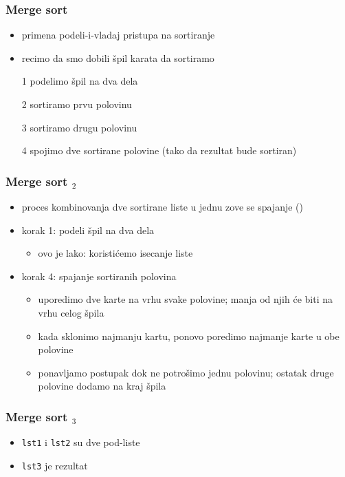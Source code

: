 \documentclass[utf8,compress]{beamer}
\begin{document}
\begin{frame}[fragile]
  \frametitle{Merge sort}
  \begin{itemize}
    \item primena podeli-i-vladaj pristupa na sortiranje
    \item recimo da smo dobili špil karata da sortiramo
    \item[1] podelimo špil na dva dela
    \item[2] sortiramo prvu polovinu
    \item[3] sortiramo drugu polovinu
    \item[4] spojimo dve sortirane polovine (tako da rezultat bude sortiran)
  \end{itemize}
\end{frame}

\begin{frame}[fragile]
  \frametitle{Merge sort $_2$}
  \begin{itemize}
    \item proces kombinovanja dve sortirane liste u jednu zove se spajanje ()
    \item korak 1: podeli špil na dva dela
  \begin{itemize}
    \item ovo je lako: koristićemo isecanje liste
  \end{itemize}
    \item korak 4: spajanje sortiranih polovina
  \begin{itemize}
    \item uporedimo dve karte na vrhu svake polovine; manja od njih će biti na vrhu celog špila
    \item kada sklonimo najmanju kartu, ponovo poredimo najmanje karte u obe polovine
    \item ponavljamo postupak dok ne potrošimo jednu polovinu; ostatak druge polovine dodamo na kraj špila
  \end{itemize}
  \end{itemize}
\end{frame}

\begin{frame}[fragile]
  \frametitle{Merge sort $_3$}
  \begin{itemize}
    \item \texttt{lst1} i \texttt{lst2} su dve pod-liste
    \item \texttt{lst3} je rezultat
  \end{itemize}
\end{frame}
\end{document}
